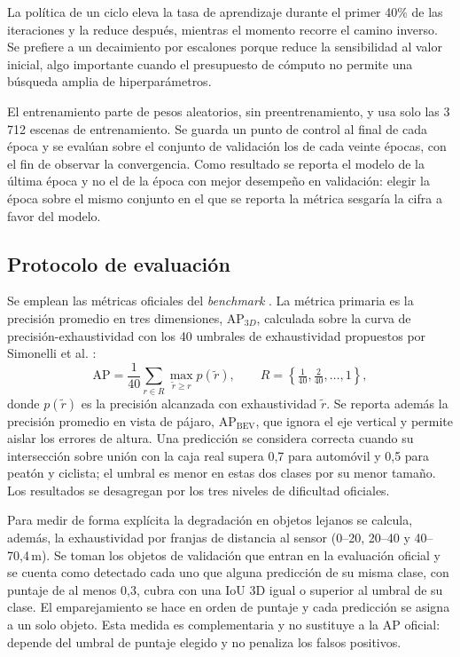 \documentclass[11pt,letterpaper]{article}
\begin{document}
La política de un ciclo \cite{smith2017} eleva la tasa de aprendizaje durante el primer 40\% de las iteraciones y la reduce después, mientras el momento recorre el camino inverso. Se prefiere a un decaimiento por escalones porque reduce la sensibilidad al valor inicial, algo importante cuando el presupuesto de cómputo no permite una búsqueda amplia de hiperparámetros.

El entrenamiento parte de pesos aleatorios, sin preentrenamiento, y usa solo las 3\,712 escenas de entrenamiento. Se guarda un punto de control al final de cada época y se evalúan sobre el conjunto de validación los de cada veinte épocas, con el fin de observar la convergencia. Como resultado se reporta el modelo de la última época y no el de la época con mejor desempeño en validación: elegir la época sobre el mismo conjunto en el que se reporta la métrica sesgaría la cifra a favor del modelo.

\subsection{Protocolo de evaluación}

Se emplean las métricas oficiales del \textit{benchmark} \cite{geiger2013}. La métrica primaria es la precisión promedio en tres dimensiones, AP$_{3D}$, calculada sobre la curva de precisión-exhaustividad con los 40 umbrales de exhaustividad propuestos por Simonelli et al. \cite{simonelli2019}:
\begin{equation}
\text{AP} = \frac{1}{40}\sum_{r \in R} \max_{\tilde{r} \geq r} p(\tilde{r}), \qquad R = \left\{\tfrac{1}{40}, \tfrac{2}{40}, \dots, 1\right\},
\end{equation}
donde $p(\tilde r)$ es la precisión alcanzada con exhaustividad $\tilde r$. Se reporta además la precisión promedio en vista de pájaro, AP$_{\text{BEV}}$, que ignora el eje vertical y permite aislar los errores de altura. Una predicción se considera correcta cuando su intersección sobre unión con la caja real supera 0,7 para automóvil y 0,5 para peatón y ciclista; el umbral es menor en estas dos clases por su menor tamaño. Los resultados se desagregan por los tres niveles de dificultad oficiales.

Para medir de forma explícita la degradación en objetos lejanos se calcula, además, la exhaustividad por franjas de distancia al sensor (0--20, 20--40 y 40--70,4\,m). Se toman los objetos de validación que entran en la evaluación oficial y se cuenta como detectado cada uno que alguna predicción de su misma clase, con puntaje de al menos 0,3, cubra con una IoU 3D igual o superior al umbral de su clase. El emparejamiento se hace en orden de puntaje y cada predicción se asigna a un solo objeto. Esta medida es complementaria y no sustituye a la AP oficial: depende del umbral de puntaje elegido y no penaliza los falsos positivos.
\end{document}
